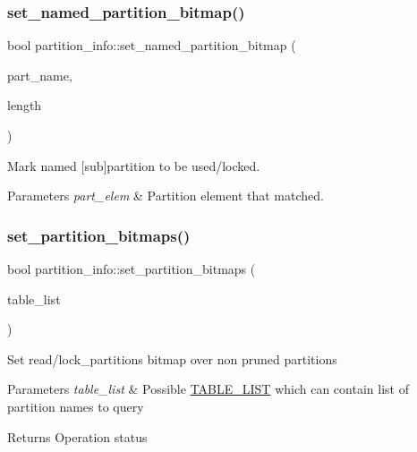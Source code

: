 \subsubsection{\texorpdfstring{set\+\_\+named\+\_\+partition\+\_\+bitmap()}{set\_named\_partition\_bitmap()}}
{\footnotesize\ttfamily bool partition\+\_\+info\+::set\+\_\+named\+\_\+partition\+\_\+bitmap (\begin{DoxyParamCaption}\item[{const char $\ast$}]{part\+\_\+name,  }\item[{size\+\_\+t}]{length }\end{DoxyParamCaption})}

Mark named \mbox{[}sub\mbox{]}partition to be used/locked.


\begin{DoxyParams}{Parameters}
{\em part\+\_\+elem} & Partition element that matched. \\
\hline
\end{DoxyParams}
\mbox{\label{classpartition__info_a2d9a2052edfc8a92e7fc432de99dcdfb}} 
\subsubsection{\texorpdfstring{set\+\_\+partition\+\_\+bitmaps()}{set\_partition\_bitmaps()}}
{\footnotesize\ttfamily bool partition\+\_\+info\+::set\+\_\+partition\+\_\+bitmaps (\begin{DoxyParamCaption}\item[{\mbox{\hyperlink{structTABLE__LIST}{T\+A\+B\+L\+E\+\_\+\+L\+I\+ST}} $\ast$}]{table\+\_\+list }\end{DoxyParamCaption})}

Set read/lock\+\_\+partitions bitmap over non pruned partitions


\begin{DoxyParams}{Parameters}
{\em table\+\_\+list} & Possible \mbox{\hyperlink{structTABLE__LIST}{T\+A\+B\+L\+E\+\_\+\+L\+I\+ST}} which can contain list of partition names to query\\
\hline
\end{DoxyParams}
\begin{DoxyReturn}{Returns}
Operation status 
\end{DoxyReturn}

